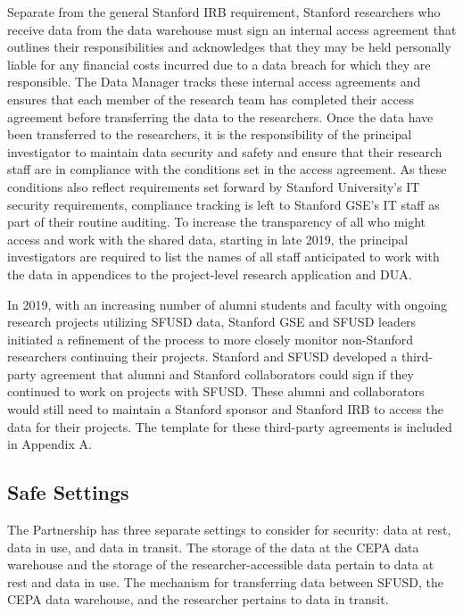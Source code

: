 Separate from the general Stanford IRB requirement, Stanford researchers who receive data from the data warehouse must sign an internal access agreement that outlines their responsibilities and acknowledges that they may be held personally liable for any financial costs incurred due to a data breach for which they are responsible. The Data Manager tracks these internal access agreements and ensures that each member of the research team has completed their access agreement before transferring the data to the researchers. Once the data have been transferred to the researchers, it is the responsibility of the principal investigator to maintain data security and safety and ensure that their research staff are in compliance with the conditions set in the access agreement. As these conditions also reflect requirements set forward by Stanford University's IT security requirements, compliance tracking is left to Stanford GSE's IT staff as part of their routine auditing. To increase the transparency of all who might access and work with the shared data, starting in late 2019, the principal investigators are required to list the names of all staff anticipated to work with the data in appendices to the project-level research application and DUA.

In 2019, with an increasing number of alumni students and faculty with ongoing research projects utilizing SFUSD data, Stanford GSE and SFUSD leaders initiated a refinement of the process to more closely monitor non-Stanford researchers continuing their projects. Stanford and SFUSD developed a third-party agreement that alumni and Stanford collaborators could sign if they continued to work on projects with SFUSD. These alumni and collaborators would still need to maintain a Stanford sponsor and Stanford IRB to access the data for their projects. The template for these third-party agreements is included in Appendix A.

\hypertarget{safe-settings-4}{%
\subsection{Safe Settings}\label{safe-settings-4}}

The Partnership has three separate settings to consider for security: data at rest, data in use, and data in transit. The storage of the data at the CEPA data warehouse and the storage of the researcher-accessible data pertain to data at rest and data in use. The mechanism for transferring data between SFUSD, the CEPA data warehouse, and the researcher pertains to data in transit.

